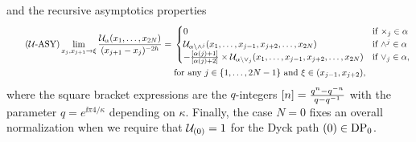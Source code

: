 \documentclass[oneside,english]{amsart}
\numberwithin{equation}{section}
\numberwithin{figure}{section}
\theoremstyle{plain}
\theoremstyle{plain}
\theoremstyle{plain}
\theoremstyle{remark}
\theoremstyle{plain}
\theoremstyle{plain}
\theoremstyle{plain}
\theoremstyle{plain}
\theoremstyle{plain}
\theoremstyle{plain}
\theoremstyle{plain}
\theoremstyle{plain}
\newcommand{\blue}[1]{{\color{blue} #1}}
\begin{document}
and the %
recursive asymptotics properties
\begin{align}\label{eq: ASY for conformal blocks} \tag{$\ConfBlockFun$-ASY}
\lim_{x_j , x_{j+1} \to \xi} 
\frac{\ConfBlockFun_\alpha (x_1 , \ldots, x_{2N})}{(x_{j+1} - x_j)^{-2h}}
= \; & \begin{cases}
0 & \text{if } \slopeat{j} \in \alpha \\
   \ConfBlockFun_{\alpha \removeupwedge{j}} (x_1, \ldots, x_{j-1} , x_{j+2} , \ldots, x_{2N}) 
& \text{if } \upwedgeat{j} \in \alpha \\
-\frac{\qnum{\alpha(j)+1}}{\qnum{\alpha(j)+2}} \times
\ConfBlockFun_{\alpha \removedownwedge{j}} (x_1, \ldots, x_{j-1} , x_{j+2} , \ldots, x_{2N})  & \text{if } \downwedgeat{j} \in \alpha ,
    \end{cases}  \\
\nonumber 
& \text{for any $j \in \set{1, \ldots, 2N-1}$ and $\xi \in (x_{j-1}, x_{j+2})$,}
\end{align}
%
where %
the square bracket expressions are the $q$-integers
$\left[n\right] = \frac{q^n - q^{-n}}{q - q^{-1}}$
with the parameter $q = e^{\ii \pi 4 / \kappa}$ depending on $\kappa$.
Finally, the case $N=0$ fixes an overall normalization when
we require that $\mathcal{U}_{(0)} = 1$ for the Dyck path ${(0)} \in \mathrm{DP}_0$.
\end{document}
